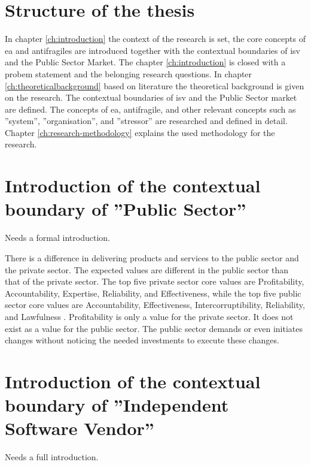 \section{Structure of the thesis}
\label{sec:structure}
In chapter \ref{ch:introduction} the context of the research is set, the core concepts of \acrshort{ea} and \glspl{antifragile} are introduced together with the contextual boundaries of \acrshort{isv} and the Public Sector Market. The chapter \ref{ch:introduction} is closed with a probem statement and the belonging research questions. In chapter \ref{ch:theoreticalbackground} based on literature the theoretical background is given on the research. The contextual boundaries of \acrshort{isv} and the Public Sector market are defined. The concepts of \acrshort{ea},  \gls{antifragile}, and other relevant concepts such as ''system'', ''organisation'', and ''stressor'' are researched and defined in detail. Chapter \ref{ch:research-methodology} explains the used methodology for the research.

\section{Introduction of the contextual boundary of ''Public Sector''}
\label{sec:intropublicsector}
\begin{remark}
	Needs a formal introduction.
\end{remark}
There is a difference in delivering products and services to the public sector and the private sector. The expected values are different in the public sector than that of the private sector. The top five private sector core values are  Profitability, Accountability, Expertise, Reliability, and Effectiveness, while the top five public sector core values are Accountability, Effectiveness, Intercorruptibility, Reliability, and Lawfulness \parencite{Wal2008}. Profitability is only a value for the private sector. It does not exist as a value for the public sector.  The public sector demands or even initiates changes without noticing the needed investments to execute these changes.

\section{Introduction of the contextual boundary of ''Independent Software Vendor''}
\label{sec:introisv}
\begin{remark}
	Needs a full introduction.
\end{remark}

